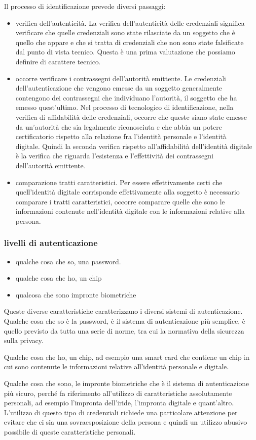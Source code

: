 Il processo di identificazione prevede diversi passaggi:
\begin{itemize}
    \item verifica dell'autenticità. La verifica dell'autenticità delle credenziali significa verificare che quelle credenziali sono state rilasciate da un soggetto che è quello che appare e che si tratta di credenziali che non sono state falsificate dal punto di vista tecnico. Questa è una prima valutazione che possiamo definire di carattere tecnico.
    \item occorre verificare i contrassegni dell'autorità emittente. Le credenziali dell'autenticazione che vengono emesse da un soggetto generalmente contengono dei contrassegni che individuano l'autorità, il soggetto che ha emesso quest'ultimo. Nel processo di tecnologico di identificazione, nella verifica di affidabilità delle credenziali, occorre che queste siano state emesse da un'autorità che sia legalmente riconosciuta e che abbia un potere certificatorio rispetto alla relazione fra l'identità personale e l'identità digitale. Quindi la seconda verifica rispetto all'affidabilità dell'identità digitale è la verifica che riguarda l'esistenza e l'effettività dei contrassegni dell'autorità emittente.
    \item comparazione tratti caratteristici. Per essere effettivamente certi che quell'identità digitale corrisponde effettivamente alla soggetto è necessario comparare i tratti caratteristici, occorre comparare quelle che sono le informazioni contenute nell'identità digitale con le informazioni relative alla persona.
\end{itemize}

\subsubsection{livelli di autenticazione}
 
 \begin{itemize}
     \item qualche cosa che so, una password.
     \item qualche cosa che ho, un chip
     \item qualcosa che sono impronte biometriche
 \end{itemize}
 Queste diverse caratteristiche caratterizzano i diversi sistemi di autenticazione. Qualche cosa che so è la password, è il sistema di autenticazione più semplice, è quello previsto da tutta una serie di norme, tra cui la normativa della sicurezza sulla privacy.\par
 Qualche cosa che ho, un chip, ad esempio una smart card che contiene un chip in cui sono contenute le informazioni relative all'identità personale e digitale.\par
 Qualche cosa che sono, le impronte biometriche che è il sistema di autenticazione più sicuro, perché fa riferimento all'utilizzo di caratteristiche assolutamente personali, ad esempio l'impronta dell'iride, l'impronta digitale e quant'altro. L'utilizzo di questo tipo di credenziali richiede una particolare attenzione per evitare che ci sia una sovraesposizione della persona e quindi un utilizzo abusivo possibile di queste caratteristiche personali.\par
